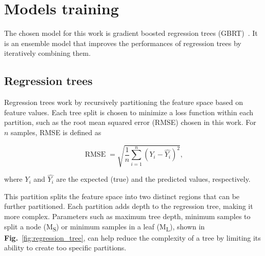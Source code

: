 \section{Models training}
\label{sec:models_training}
The chosen model for this work is gradient boosted regression trees (GBRT)~\cite{Friedman2001GreedyMachine.}. It is an ensemble model that improves the performances of regression trees by iteratively combining them. 

\subsection{Regression trees}
Regression trees work by recursively partitioning the feature space based on feature values. Each tree split is chosen to minimize a loss function within each partition, such as the root mean squared error (RMSE) chosen in this work. For $n$ samples, RMSE is defined as 

\begin{equation}
\label{eq:rmse}
    \operatorname {RMSE} = \sqrt{\frac{1}{n}\sum _{i=1}^{n}\left(Y_{i}-{\hat {Y_{i}}}\right)^{2}},
\end{equation}

where $Y_{i}$ and $\hat {Y_{i}}$ are the expected (true) and the predicted values, respectively.


This partition splits the feature space into two distinct regions that can be further partitioned. Each partition adds depth to the regression tree, making it more complex. Parameters such as maximum tree depth, minimum samples to split a node (M\textsubscript{S}) or minimum samples in a leaf (M\textsubscript{L}), shown in \textbf{Fig.}~\ref{fig:regression_tree}, can help reduce the complexity of a tree by limiting its ability to create too specific partitions. 


